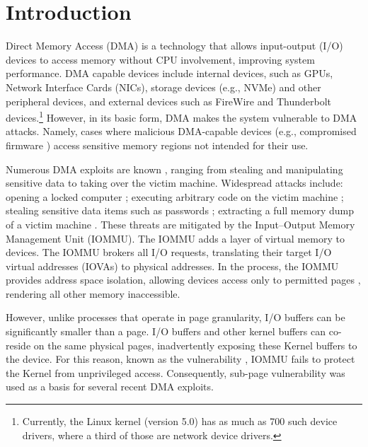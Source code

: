 \section{Introduction}

Direct Memory Access (DMA) is a technology that allows input-output (I/O) devices to access memory without CPU involvement, improving system performance.
DMA capable devices include internal devices, such as GPUs, Network Interface Cards (NICs), storage devices (e.g., NVMe) and other peripheral devices, and external devices such as FireWire and Thunderbolt devices.\footnote{Currently, the Linux kernel (version 5.0) has as much as 700 such device drivers, where a third of those are network device drivers.} However, in its basic form, DMA makes the system vulnerable to DMA attacks. Namely, cases where malicious DMA-capable devices (e.g., compromised firmware \cite{Gal14,Ben17a}) access sensitive memory regions not intended for their use. 


Numerous DMA exploits are known \cite{Dor04,BDK10,thunder}, ranging from stealing and manipulating sensitive data to taking over the victim machine. Widespread attacks include: opening a locked computer \cite{MM, Fin14}; executing arbitrary code on the victim machine \cite{Fri16, Woj08, AD10,thunder}; stealing sensitive data items such as passwords \cite{SB12, LKV13, Cim16, BR12}; extracting a full memory dump of a victim machine \cite{MM, Vol, Fin14, GA10}. These threats are mitigated by the Input–Output Memory Management Unit (IOMMU). The IOMMU adds a layer of virtual memory to devices. The IOMMU brokers all I/O requests, translating their target I/O virtual addresses (IOVAs) to physical addresses. In the process, the IOMMU provides address space isolation, allowing devices access only to permitted pages
, rendering all other memory inaccessible.

However, unlike processes that operate in page granularity, I/O buffers can be significantly smaller than a page. I/O buffers and other kernel buffers can co-reside on the same physical pages, inadvertently exposing these Kernel buffers to the device. For this reason, known as the \subpage{} vulnerability \cite{MMT16,thunder}, IOMMU fails to protect the Kernel from unprivileged access. Consequently, sub-page vulnerability was used as a basis for several recent DMA exploits.


